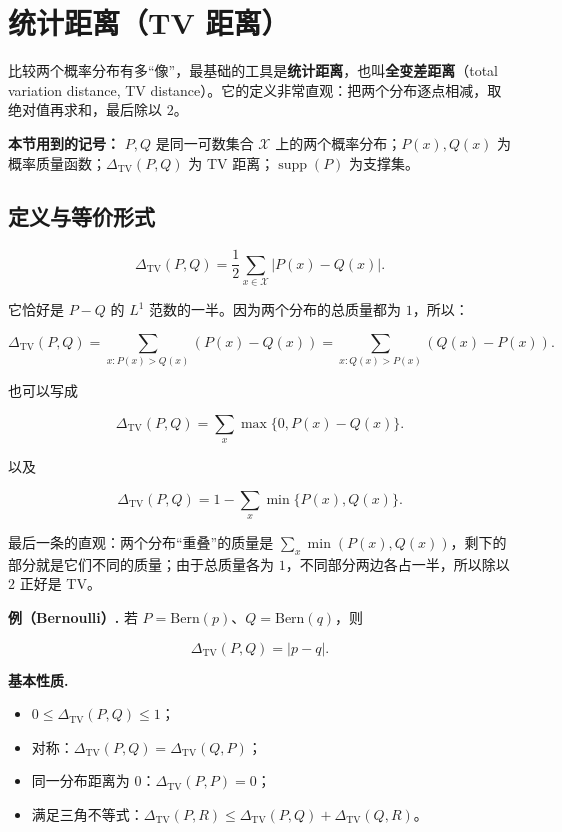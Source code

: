 \section{统计距离（TV 距离）}


比较两个概率分布有多“像”，最基础的工具是\textbf{统计距离}，也叫\textbf{全变差距离}（total variation distance, TV distance）。它的定义非常直观：把两个分布逐点相减，取绝对值再求和，最后除以 $2$。

\textbf{本节用到的记号：} $P,Q$ 是同一可数集合 $\mathcal X$ 上的两个概率分布；$P(x),Q(x)$ 为概率质量函数；$\Delta_{\mathrm{TV}}(P,Q)$ 为 TV 距离；$\operatorname{supp}(P)$ 为支撑集。

\subsection{定义与等价形式}


\[
\boxed{
\Delta_{\mathrm{TV}}(P,Q)
=\frac12\sum_{x\in\mathcal X}|P(x)-Q(x)|
}.
\]

它恰好是 $P-Q$ 的 $L^1$ 范数的一半。因为两个分布的总质量都为 $1$，所以：

\[
\Delta_{\mathrm{TV}}(P,Q)
=\sum_{x:P(x)>Q(x)}(P(x)-Q(x))
=\sum_{x:Q(x)>P(x)}(Q(x)-P(x)).
\]

也可以写成

\[
\Delta_{\mathrm{TV}}(P,Q)
=\sum_x\max\{0,P(x)-Q(x)\}.
\]

以及

\[
\Delta_{\mathrm{TV}}(P,Q)
=1-\sum_x\min\{P(x),Q(x)\}.
\]

最后一条的直观：两个分布“重叠”的质量是 $\sum_x\min(P(x),Q(x))$，剩下的部分就是它们不同的质量；由于总质量各为 $1$，不同部分两边各占一半，所以除以 $2$ 正好是 TV。

\textbf{例（Bernoulli）.} 若 $P=\mathrm{Bern}(p)$、$Q=\mathrm{Bern}(q)$，则

\[
\Delta_{\mathrm{TV}}(P,Q)=|p-q|.
\]

\textbf{基本性质.}

\begin{itemize}
\item $0\le\Delta_{\mathrm{TV}}(P,Q)\le1$；
\item 对称：$\Delta_{\mathrm{TV}}(P,Q)=\Delta_{\mathrm{TV}}(Q,P)$；
\item 同一分布距离为 $0$：$\Delta_{\mathrm{TV}}(P,P)=0$；
\item 满足三角不等式：$\Delta_{\mathrm{TV}}(P,R)\le\Delta_{\mathrm{TV}}(P,Q)+\Delta_{\mathrm{TV}}(Q,R)$。
\end{itemize}


